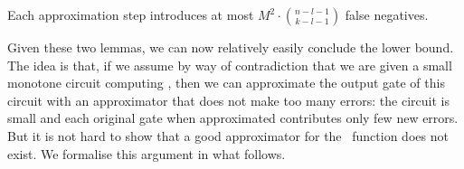 \begin{lemma}\label{lem:new-false-negatives}
Each approximation step introduces at most $M^2 \cdot\binom{n-l-1}{k-l-1}$ false negatives.
\end{lemma}


Given these two lemmas, we can now relatively easily conclude the lower bound. The idea is that, if we assume by way of contradiction that we are given a small monotone circuit computing \cliquenk, then we can approximate the output gate of this circuit with an approximator that does not make too many errors: the circuit is small and each original gate when approximated contributes only  few new errors. But it is not hard to show that a good approximator for the \cliquenk\ function does not exist. We formalise this argument in what follows.





\bigskip









